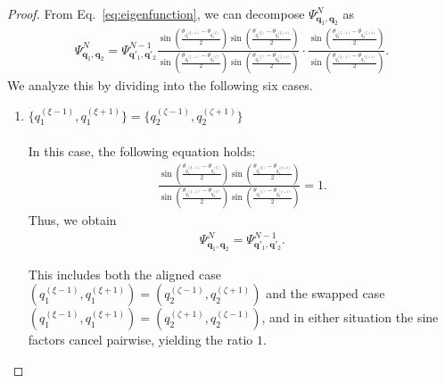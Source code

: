 \documentclass[10pt,a4paper]{amsart}
\begin{document}
\begin{proof}
%
From Eq.~\eqref{eq:eigenfunction}, we can decompose $\Psi^N_{\bm{q}_1, \bm{q}_2}$ as
%
\begin{align}
    \Psi^N_{\bm{q}_1, \bm{q}_2}
    = \Psi^{N-1}_{\bm{q}'_1, \bm{q}'_2}\frac{\sin\left( \frac{\theta_{q_1^{(\xi-1)}} - \theta_{q_1^{(\xi)}}}{2} \right)\sin\left( \frac{\theta_{q_1^{(\xi)}} - \theta_{q_1^{(\xi+1)}}}{2} \right)}
           {\sin\left( \frac{\theta_{q_2^{(\zeta-1)}} - \theta_{q_2^{(\zeta)}}}{2} \right)\sin\left( \frac{\theta_{q_2^{(\zeta)}} - \theta_{q_2^{(\zeta+1)}}}{2} \right)}\cdot \frac{\sin\left( \frac{\theta_{q_2^{(\zeta-1)}} - \theta_{q_2^{(\zeta+1)}}}{2} \right)}{\sin\left( \frac{\theta_{q_1^{(\xi-1)}} - \theta_{q_1^{(\xi+1)}}}{2} \right)}.
\end{align}
%
We analyze this by dividing into the following six cases. 
%
\begin{enumerate}
\item[\textit{Case.1:}] $\{{q_1^{(\xi-1)}},{q_1^{(\xi+1)}}\} = \{{q_2^{(\zeta-1)}}, {q_2^{(\zeta+1)}}\}$\\ \\
In this case, the following equation holds: 
\begin{align}
    \frac{\sin\left( \frac{\theta_{q_1^{(\xi-1)}} - \theta_{q_1^{(\xi)}}}{2} \right)\sin\left( \frac{\theta_{q_1^{(\xi)}} - \theta_{q_1^{(\xi+1)}}}{2} \right)}
           {\sin\left( \frac{\theta_{q_2^{(\zeta-1)}} - \theta_{q_2^{(\zeta)}}}{2} \right)\sin\left( \frac{\theta_{q_2^{(\zeta)}} - \theta_{q_2^{(\zeta+1)}}}{2} \right)} = 1.
\end{align}
Thus, we obtain
\begin{align}
    \Psi^N_{\bm{q}_1, \bm{q}_2} = \Psi^{N-1}_{\bm{q}'_1, \bm{q}'_2}.
\end{align}

This includes both the aligned case $(q_1^{(\xi-1)},q_1^{(\xi+1)})=(q_2^{(\zeta-1)},q_2^{(\zeta+1)})$ and the swapped case $(q_1^{(\xi-1)},q_1^{(\xi+1)})=(q_2^{(\zeta+1)},q_2^{(\zeta-1)})$, and in either situation the sine factors cancel pairwise, yielding the ratio $1$.


\end{enumerate}
\end{proof}
\end{document}
